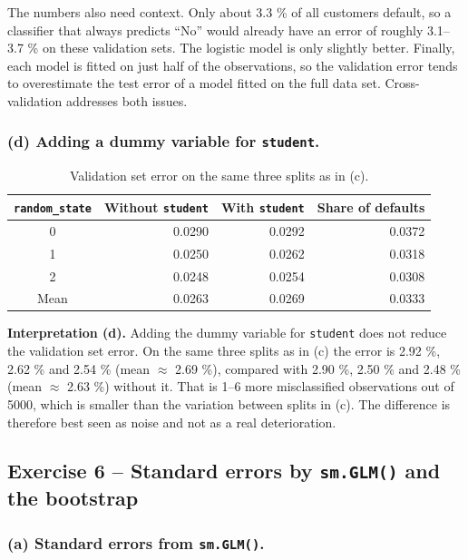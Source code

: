 \documentclass[11pt]{article}
\begin{document}
The numbers also need context. Only about 3.3 \% of all customers default, so a classifier that always predicts ``No'' would already have an error of roughly 3.1--3.7 \% on these validation sets. The logistic model is only slightly better. Finally, each model is fitted on just half of the observations, so the validation error tends to overestimate the test error of a model fitted on the full data set. Cross-validation addresses both issues.

\subsubsection*{(d) Adding a dummy variable for \texttt{student}.}

\begin{table}[H]
  \centering
  \begin{tabular}{crrr}
    \toprule
    \texttt{random\_state} & Without \texttt{student} & With \texttt{student} & Share of defaults \\
    \midrule
    0 & 0.0290 & 0.0292 & 0.0372 \\
    1 & 0.0250 & 0.0262 & 0.0318 \\
    2 & 0.0248 & 0.0254 & 0.0308 \\
    \midrule
    Mean & 0.0263 & 0.0269 & 0.0333 \\
    \bottomrule
  \end{tabular}
  \caption{Validation set error on the same three splits as in (c).}
\end{table}

\textbf{Interpretation (d).} Adding the dummy variable for \texttt{student} does not reduce the validation set error. On the same three splits as in (c) the error is 2.92 \%, 2.62 \% and 2.54 \% (mean $\approx$ 2.69 \%), compared with 2.90 \%, 2.50 \% and 2.48 \% (mean $\approx$ 2.63 \%) without it. That is 1--6 more misclassified observations out of 5000, which is smaller than the variation between splits in (c). The difference is therefore best seen as noise and not as a real deterioration.

\subsection*{Exercise 6 -- Standard errors by \texttt{sm.GLM()} and the bootstrap}

\subsubsection*{(a) Standard errors from \texttt{sm.GLM()}.}
\end{document}
